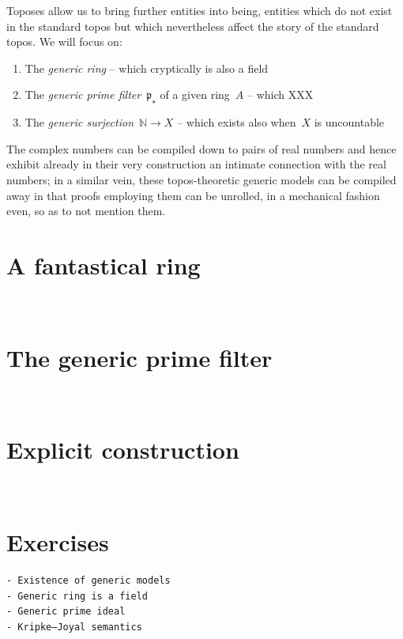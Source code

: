 \documentclass[10pt,reqno,a4paper,openany]{amsbook}
\theoremstyle{definition}
\theoremstyle{plain}
\theoremstyle{remark}
\newcommand{\NN}{\mathbb{N}}
\newcommand{\ppp}{\mathfrak{p}}
\newcommand{\?}{\,{:}\,}
\renewcommand{\_}{\mathpunct{.}\,}
\begin{document}
Toposes allow us to bring further entities into being, entities which do not
exist in the standard topos but which nevertheless affect the story of the
standard topos. We will focus on:
\begin{enumerate}
\item The \emph{generic ring} -- which cryptically is also a field
\item The \emph{generic prime filter}~$\ppp_\star$ of a given ring~$A$ -- which
XXX
\item The \emph{generic surjection}~$\NN \to X$ -- which exists also when~$X$
is uncountable
\end{enumerate}
The complex numbers can be compiled down to pairs of real numbers and hence
exhibit already in their very construction an intimate connection with the real
numbers; in a similar vein, these topos-theoretic generic models can be
compiled away in that proofs employing them can be unrolled, in a mechanical
fashion even, so as to not mention them.


\section{A fantastical ring}
\newpage
\ \newpage

\section{The generic prime filter}
\newpage
\ \newpage

\section{Explicit construction}
\newpage
\ \newpage

\section{Exercises}


\vfill{\small%
\begin{verbatim}
- Existence of generic models
- Generic ring is a field
- Generic prime ideal
- Kripke–Joyal semantics
\end{verbatim}
}

\printbibliography
\end{document}

